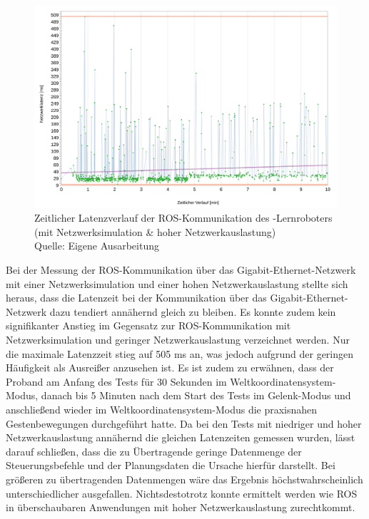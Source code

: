 \begin{figure}[htb]
	\centering
	\includegraphics[width=1.04\textwidth]{images/ergebnisse/ROS_App_mit_Netzwerksimulation_und_hohe_Auslastung}
	\caption[Zeitlicher Latenzverlauf der ROS-Kommunikation des -Lernroboters (mit Netzwerksimulation \& hoher Netzwerkauslastung)]{Zeitlicher Latenzverlauf der ROS-Kommunikation des -Lernroboters (mit Netzwerksimulation \& hoher Netzwerkauslastung)\\Quelle: Eigene Ausarbeitung}
	\label{fig:measurement_robot_ros_with_network_simulation_high_network_traffic}
\end{figure}
\FloatBarrier

Bei der Messung der ROS-Kommunikation über das Gigabit-Ethernet-Netzwerk mit einer Netzwerksimulation und einer hohen Netzwerkauslastung stellte sich heraus, dass die Latenzeit bei der Kommunikation über das Gigabit-Ethernet-Netzwerk dazu tendiert annähernd gleich zu bleiben. Es konnte zudem kein signifikanter Anstieg im Gegensatz zur ROS-Kommunikation mit Netzwerksimulation und geringer Netzwerkauslastung verzeichnet werden. Nur die maximale Latenzzeit stieg auf 505 ms an, was jedoch aufgrund der geringen Häufigkeit als Ausreißer anzusehen ist. Es ist zudem zu erwähnen, dass der Proband am Anfang des Tests für 30 Sekunden im Weltkoordinatensystem-Modus, danach bis 5 Minuten nach dem Start des Tests im Gelenk-Modus und anschließend wieder im Weltkoordinatensystem-Modus die praxisnahen Gestenbewegungen durchgeführt hatte. Da bei den Tests mit niedriger und hoher Netzwerkauslastung annähernd die gleichen Latenzeiten gemessen wurden, lässt darauf schließen, dass die zu Übertragende geringe Datenmenge der Steuerungsbefehle und der Planungsdaten die Ursache hierfür darstellt. Bei größeren zu übertragenden Datenmengen wäre das Ergebnis höchstwahrscheinlich unterschiedlicher ausgefallen. Nichtsdestotrotz konnte ermittelt werden wie ROS in überschaubaren Anwendungen mit hoher Netzwerkauslastung zurechtkommt.

